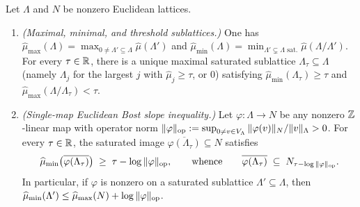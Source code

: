 \begin{proposition}
\label{prop:05:euc-bost}
Let $\Lambda$ and $N$ be nonzero Euclidean lattices.
\begin{enumerate}[label=\textup{(\roman*)}]
\item \emph{(Maximal, minimal, and threshold sublattices.)} One has $\widehat{\mu}_{\max}(\Lambda) = \max_{0 \neq \Lambda' \subseteq \Lambda} \widehat{\mu}(\Lambda')$ and $\widehat{\mu}_{\min}(\Lambda) = \min_{\Lambda' \subsetneq \Lambda\text{ sat.}} \widehat{\mu}(\Lambda / \Lambda')$. For every $\tau \in \mathbb{R}$, there is a unique maximal saturated sublattice $\Lambda_\tau \subseteq \Lambda$ (namely $\Lambda_j$ for the largest $j$ with $\widehat{\mu}_j \ge \tau$, or $0$) satisfying $\widehat{\mu}_{\min}(\Lambda_\tau) \ge \tau$ and $\widehat{\mu}_{\max}(\Lambda / \Lambda_\tau) < \tau$.
\item \emph{(Single-map Euclidean Bost slope inequality.)} Let $\varphi : \Lambda \to N$ be any nonzero $\mathbb{Z}$-linear map with operator norm $\|\varphi\|_{\mathrm{op}} := \sup_{0 \neq v \in V_\Lambda} \|\varphi(v)\|_N / \|v\|_\Lambda > 0$. For every $\tau \in \mathbb{R}$, the saturated image $\overline{\varphi(\Lambda_\tau)} \subseteq N$ satisfies
  \begin{equation}
  \label{eq:05:euc-step}
    \widehat{\mu}_{\min}\bigl(\overline{\varphi(\Lambda_\tau)}\bigr) \;\ge\; \tau - \log\|\varphi\|_{\mathrm{op}},
    \qquad\text{whence}\qquad
    \overline{\varphi(\Lambda_\tau)} \;\subseteq\; N_{\tau - \log\|\varphi\|_{\mathrm{op}}}.
  \end{equation}
  In particular, if $\varphi$ is nonzero on a saturated sublattice $\Lambda' \subseteq \Lambda$, then $\widehat{\mu}_{\min}(\Lambda') \le \widehat{\mu}_{\max}(N) + \log\|\varphi\|_{\mathrm{op}}$.
\end{enumerate}
\end{proposition}

